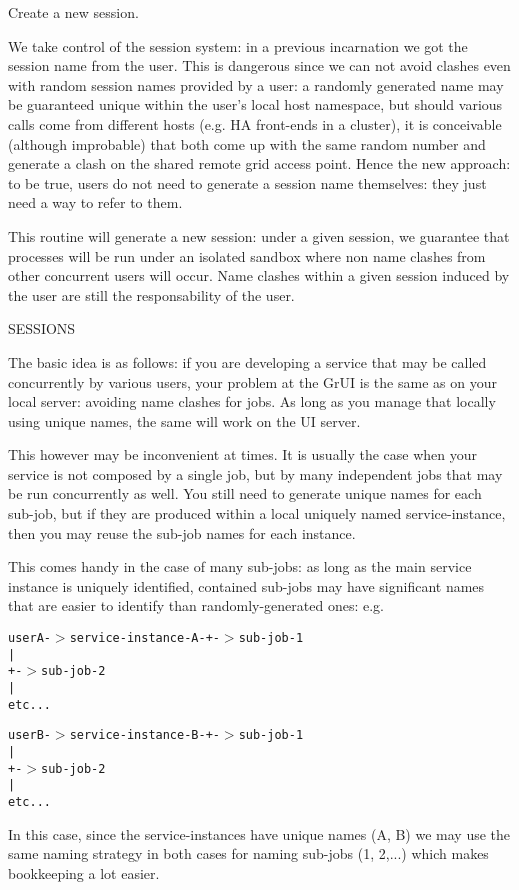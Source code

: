 Create a new session. 

We take control of the session system: in a previous incarnation we got the session name from the user. This is dangerous since we can not avoid clashes even with random session names provided by a user: a randomly generated name may be guaranteed unique within the user's local host namespace, but should various calls come from different hosts (e.g. HA front-ends in a cluster), it is conceivable (although improbable) that both come up with the same random number and generate a clash on the shared remote grid access point. Hence the new approach: to be true, users do not need to generate a session name themselves: they just need a way to refer to them.

This routine will generate a new session: under a given session, we guarantee that processes will be run under an isolated sandbox where non name clashes from other concurrent users will occur. Name clashes within a given session induced by the user are still the responsability of the user.

SESSIONS

The basic idea is as follows: if you are developing a service that may be called concurrently by various users, your problem at the Gr\-UI is the same as on your local server: avoiding name clashes for jobs. As long as you manage that locally using unique names, the same will work on the UI server.

This however may be inconvenient at times. It is usually the case when your service is not composed by a single job, but by many independent jobs that may be run concurrently as well. You still need to generate unique names for each sub-job, but if they are produced within a local uniquely named service-instance, then you may reuse the sub-job names for each instance.

This comes handy in the case of many sub-jobs: as long as the main service instance is uniquely identified, contained sub-jobs may have significant names that are easier to identify than randomly-generated ones: e.g. \small\begin{alltt}
    user A -$>$ service-instance-A -+-$>$ sub-job-1
                                  |
                                  +-$>$ sub-job-2
                                  |
                                  etc...\end{alltt}\normalsize 


\small\begin{alltt}    user B -$>$ service-instance-B -+-$>$ sub-job-1
                                  |
                                  +-$>$ sub-job-2
                                  |
                                  etc...
 \end{alltt}\normalsize 
 In this case, since the service-instances have unique names (A, B) we may use the same naming strategy in both cases for naming sub-jobs (1, 2,...) which makes bookkeeping a lot easier.

